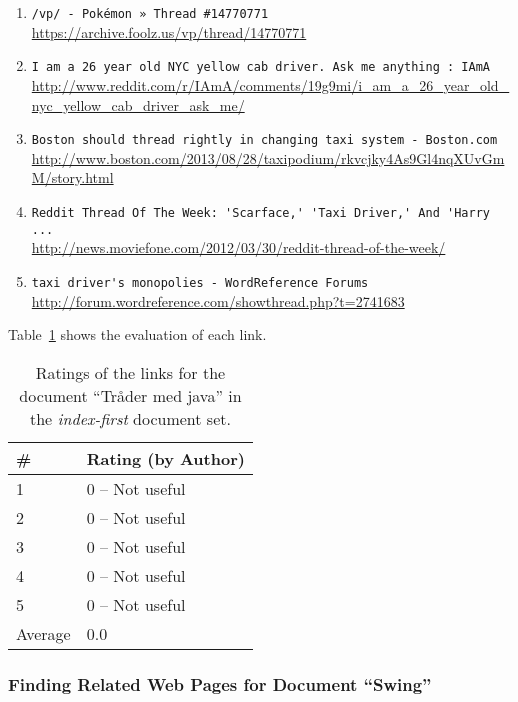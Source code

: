 \begin{enumerate}
\item
    \verb|/vp/ - Pokémon » Thread #14770771| \\
    \url{https://archive.foolz.us/vp/thread/14770771}
\item
    \verb|I am a 26 year old NYC yellow cab driver. Ask me anything : IAmA| \\
    \url{http://www.reddit.com/r/IAmA/comments/19g9mi/i_am_a_26_year_old_nyc_yellow_cab_driver_ask_me/}
\item
    \verb|Boston should thread rightly in changing taxi system - Boston.com| \\
    \url{http://www.boston.com/2013/08/28/taxipodium/rkvcjky4As9Gl4nqXUvGmM/story.html}
\item
    \verb|Reddit Thread Of The Week: 'Scarface,' 'Taxi Driver,' And 'Harry ...| \\
    \url{http://news.moviefone.com/2012/03/30/reddit-thread-of-the-week/}
\item
    \verb|taxi driver's monopolies - WordReference Forums| \\
    \url{http://forum.wordreference.com/showthread.php?t=2741683}
\end{enumerate}

Table~\ref{tab:ratings-no-tr-der-med-java} shows the evaluation of each link.
\begin{table}[H]
\centering
\begin{tabular}{|l|l|}
\hline\hline
    \# & Rating (by Author) \\
\hline
    1 & 0 -- Not useful \\
    2 & 0 -- Not useful \\
    3 & 0 -- Not useful \\
    4 & 0 -- Not useful \\
    5 & 0 -- Not useful \\
\hline
    Average & 0.0 \\
\hline\hline
\end{tabular}
\caption{Ratings of the links for the document ``Tråder med java'' in the \textit{index-first} document set.}
\label{tab:ratings-no-tr-der-med-java}
\end{table}



\subsubsection{Finding Related Web Pages for Document ``Swing''}
\label{subsubsec:no-swing}


